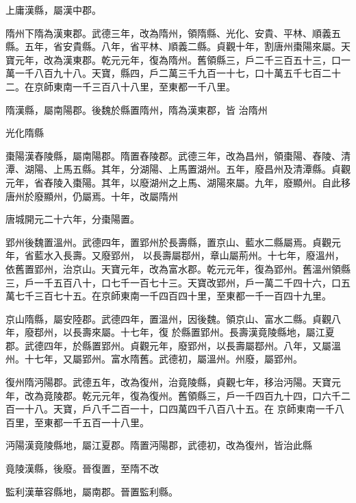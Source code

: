 \begin{pinyinscope}
 上庸漢縣，屬漢中郡。



 隋州下隋為漢東郡。武德三年，改為隋州，領隋縣、光化、安貴、平林、順義五縣。五年，省安貴縣。八年，省平林、順義二縣。貞觀十年，割唐州棗陽來屬。天寶元年，改為漢東郡。乾元元年，復為隋州。舊領縣三，戶二千三百五十三，口一萬一千八百九十八。天寶，縣四，戶二萬三千九百一十七，口十萬五千七百二十二。在京師東南一千三百八十八里，至東都一千八里。



 隋漢縣，屬南陽郡。後魏於縣置隋州，隋為漢東郡，皆
 治隋州



 光化隋縣



 棗陽漢舂陵縣，屬南陽郡。隋置舂陵郡。武德三年，改為昌州，領棗陽、舂陵、清潭、湖陽、上馬五縣。其年，分湖陽、上馬置湖州。五年，廢昌州及清潭縣。貞觀元年，省舂陵入棗陽。其年，以廢湖州之上馬、湖陽來屬。九年，廢顯州。自此移唐州於廢顯州，仍屬焉。十年，改屬隋州



 唐城開元二十六年，分棗陽置。



 郢州後魏置溫州。武德四年，置郢州於長壽縣，置京山、藍水二縣屬焉。貞觀元年，省藍水入長壽。又廢郢州，
 以長壽屬鄀州，章山屬荊州。十七年，廢溫州，依舊置郢州，治京山。天寶元年，改為富水郡。乾元元年，復為郢州。舊溫州領縣三，戶一千五百八十，口七千一百七十三。天寶改郢州，戶一萬二千四十六，口五萬七千三百七十五。在京師東南一千四百四十里，至東都一千一百四十九里。



 京山隋縣，屬安陸郡。武德四年，置溫州，因後魏。領京山、富水二縣。貞觀八年，廢鄀州，以長壽來屬。十七年，復
 於縣置郢州。長壽漢竟陵縣地，屬江夏郡。武德四年，於縣置郢州。貞觀元年，廢郢州，以長壽屬鄀州。八年，又屬溫州。十七年，又屬郢州。富水隋舊。武德初，屬溫州。州廢，屬郢州。



 復州隋沔陽郡。武德五年，改為復州，治竟陵縣，貞觀七年，移治沔陽。天寶元年，改為竟陵郡。乾元元年，復為復州。舊領縣三，戶一千四百九十四，口六千二百一十八。天寶，戶八千二百一十，口四萬四千八百八十五。在
 京師東南一千八百里，至東都一千五百一十八里。



 沔陽漢竟陵縣地，屬江夏郡。隋置沔陽郡，武德初，改為復州，皆治此縣



 竟陵漢縣，後廢。晉復置，至隋不改



 監利漢華容縣地，屬南郡。晉置監利縣。




\end{pinyinscope}
